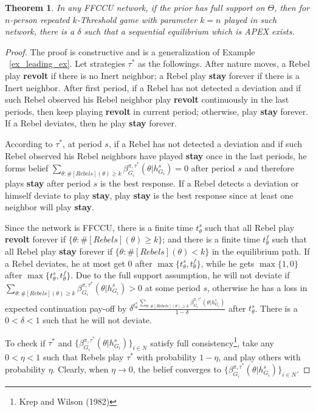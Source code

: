 \documentclass[12pt,letter]{article}
\newtheorem{theorem}{Theorem}
\theoremstyle{definition}
\theoremstyle{remark}
\theoremstyle{claim}
\begin{document}
\begin{theorem}
\label{prop:not_crowded}
In any FFCCU network, if the prior has full support on $\Theta$, then for $n$-person repeated $k$-Threshold game with parameter $k=n$ played in such network,  there is a $\delta$ such that a sequential equilibrium which is APEX exists.
\end{theorem}
\begin{proof}
The proof is constructive and is a generalization of Example ~\ref{ex_leading_ex}. Let strategies $\tau^{*}$ as the followings. After nature moves, a Rebel play \textbf{revolt}  if there is no Inert neighbor; a Rebel play \textbf{stay} forever if there is a Inert neighbor. After first period, if a Rebel has not detected a deviation and if such Rebel observed his Rebel neighbor play \textbf{revolt} continuously in the last periods, then keep playing \textbf{revolt} in current period; otherwise, play \textbf{stay} forever. If a Rebel deviates, then he play \textbf{stay} forever.

According to $\tau^{*}$, at period $s$, if a Rebel has not detected a deviation and if such Rebel observed his Rebel neighbors have played \textbf{stay} once in the last periods, he forms belief $\sum_{\theta:\#[Rebels](\theta)\geq k}\beta^{\pi,\tau^*}_{G_i}(\theta|h^{s}_{G_i})=0$ after period $s$ and therefore plays \textbf{stay} after period $s$ is the best response. If a Rebel detects a deviation or himself deviate to play \textbf{stay}, play \textbf{stay} is the best response since at least one neighbor will play \textbf{stay}. 

Since the network is FFCCU, there is a finite time $t^{s}_{\theta}$ such that all Rebel play \textbf{revolt} forever if $\{\theta: \#[Rebels](\theta)\geq k\}$; and there is a finite time $t^f_{\theta}$ such that all Rebel play \textbf{stay} forever if $\{\theta: \#[Rebels](\theta)< k\}$ in the equilibrium path. If a Rebel deviates, he at most get 0 after $\max\{t^{s}_{\theta},t^f_{\theta}\}$, while he gets $\max\{1,0\}$ after $\max\{t^{s}_{\theta},t^f_{\theta}\}$. Due to the full support assumption, he will not deviate if $\sum_{\theta:\#[Rebels](\theta)\geq k}\beta^{\pi,\tau^*}_{G_i}(\theta|h^{s}_{G_i})>0$ at some period $s$, otherwise he has a loss in expected continuation pay-off by $\delta^{t^s_{\theta}}\frac{\sum_{\theta:\#[Rebels](\theta)\geq k}\beta^{\pi,\tau^*}_{G_i}(\theta|h^{s}_{G_i})}{1-\delta}$ after $t^s_{\theta}$. There is a $0<\delta<1$ such that he will not deviate.

To check if $\tau^{*}$ and $\{\beta^{\pi,\tau^*}_{G_i}(\theta|h^{s}_{G_i})\}_{i\in N}$ satisfy full consistency\footnote{Krep and Wilson (1982)}, take any $0<\eta<1$ such that Rebels play $\tau^{*}$ with probability $1-\eta$, and play others with probability $\eta$. Clearly, when $\eta \rightarrow 0$, the belief converges to $\{\beta^{\pi,\tau^*}_{G_i}(\theta|h^{s}_{G_i})\}_{i\in N}$.
\end{proof}
\end{document}
